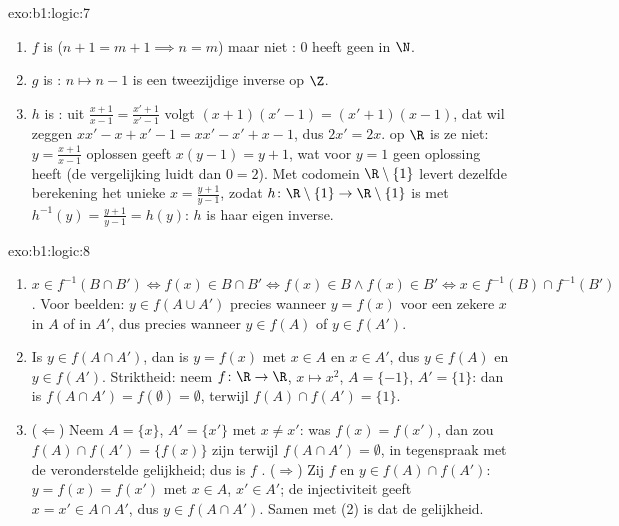 \begin{solution}{exo:b1:logic:7}
\begin{enumerate}
  \item $f$ is  ($n + 1 = m + 1 \implies n = m$) maar niet
        : $0$ heeft geen  in $\N$.
  \item $g$ is : $n \mapsto n - 1$ is een tweezijdige inverse
        op $\Z$.
  \item $h$ is : uit $\frac{x+1}{x-1} = \frac{x'+1}{x'-1}$
        volgt $(x+1)(x'-1) = (x'+1)(x-1)$, dat wil zeggen $xx' - x + x'
        - 1 = xx' - x' + x - 1$, dus $2x' = 2x$.  op $\R$ is
        ze niet: $y = \frac{x+1}{x-1}$ oplossen geeft $x(y - 1) = y +
        1$, wat voor $y = 1$ geen oplossing heeft (de vergelijking luidt
        dan $0 = 2$). Met codomein $\R \setminus \{1\}$ levert dezelfde
        berekening het unieke  $x = \frac{y+1}{y-1}$, zodat
        $h \colon \R \setminus \{1\} \to \R \setminus \{1\}$  is
        met $h^{-1}(y) = \frac{y+1}{y-1} = h(y)$: $h$ is haar eigen
        inverse.
\end{enumerate}
\end{solution}

\begin{solution}{exo:b1:logic:8}
\begin{enumerate}
  \item $x \in f^{-1}(B \cap B') \iff f(x) \in B \cap B' \iff f(x) \in
        B \land f(x) \in B' \iff x \in f^{-1}(B) \cap f^{-1}(B')$.
        Voor beelden: $y \in f(A \cup A')$ precies wanneer $y = f(x)$
        voor een zekere $x$ in $A$ of in $A'$, dus precies wanneer $y
        \in f(A)$ of $y \in f(A')$.
  \item Is $y \in f(A \cap A')$, dan is $y = f(x)$ met $x \in A$ en $x
        \in A'$, dus $y \in f(A)$ en $y \in f(A')$. Striktheid: neem $f
        \colon \R \to \R$, $x \mapsto x^2$, $A = \{-1\}$, $A' = \{1\}$:
        dan is $f(A \cap A') = f(\emptyset) = \emptyset$, terwijl $f(A)
        \cap f(A') = \{1\}$.
  \item ($\Leftarrow$) Neem $A = \{x\}$, $A' = \{x'\}$ met $x \neq x'$:
        was $f(x) = f(x')$, dan zou $f(A) \cap f(A') = \{f(x)\}$ zijn
        terwijl $f(A \cap A') = \emptyset$, in tegenspraak met de
        veronderstelde gelijkheid; dus is $f$ .
        ($\Rightarrow$) Zij $f$  en $y \in f(A) \cap f(A')$:
        $y = f(x) = f(x')$ met $x \in A$, $x' \in A'$; de injectiviteit
        geeft $x = x' \in A \cap A'$, dus $y \in f(A \cap A')$. Samen
        met (2) is dat de gelijkheid.
\end{enumerate}
\end{solution}

